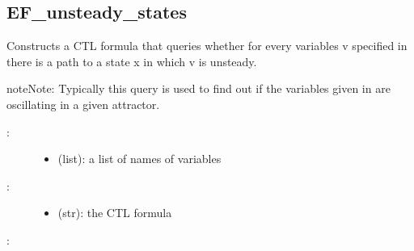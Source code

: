 \documentclass[letterpaper,10pt,english]{sphinxmanual}
\begin{document}
\subsection{EF\_unsteady\_states}
\label{\detokenize{TemporalLogic:ef-unsteady-states}}

\begin{fulllineitems}
\label{\detokenize{TemporalLogic:PyBoolNet.TemporalLogic.EF_unsteady_states}}
Constructs a CTL formula that queries whether for every variables v specified in  there is a path to a state x in which v is unsteady.

\begin{sphinxadmonition}{note}{Note:}
Typically this query is used to find out if the variables given in  are oscillating in a given attractor.
\end{sphinxadmonition}
\begin{description}
\item[{:}] \leavevmode\begin{itemize}
\item {} 
 (list): a list of names of variables

\end{itemize}

\item[{:}] \leavevmode\begin{itemize}
\item {} 
 (str): the CTL formula

\end{itemize}

\end{description}

:

\begin{sphinxVerbatim}[commandchars=\\\{\}]
  \PYG{p}{[}\PYG{p}{]}
\end{sphinxVerbatim}

\end{fulllineitems}
\end{document}
